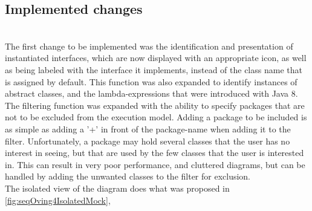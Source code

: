 \subsection{Implemented changes}\label{jiveImpl}%
~\\

The first change to be implemented  was the identification and presentation of instantiated interfaces, which are now displayed with an appropriate icon, as well as being labeled with the interface it implements, instead of the class name that is assigned by default.
This function was also expanded to identify instances of abstract classes, and the lambda-expressions that were introduced with Java 8.
~\\

The filtering function was expanded with the ability to specify packages that are not to be excluded from the execution model.
Adding a package to be included is as simple as adding a '+' in front of the package-name when adding it to the filter.
Unfortunately, a package may hold several classes that the user has no interest in seeing, but that are used by the few classes that the user is interested in.
This can result in very poor performance, and cluttered diagrams, but can be handled by adding the unwanted classes to the filter for exclusion.
~\\

The isolated view of the diagram does what was proposed in \autoref{fig:seqOving4IsolatedMock}, 
